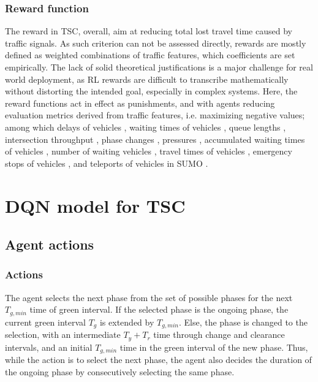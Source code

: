 \documentclass[journal]{IEEEtran}
\begin{document}
\subsubsection{Reward function}
The reward in TSC, overall, aim at reducing total lost travel time caused by traffic signals. As such criterion can not be assessed directly, rewards are mostly defined as weighted combinations of traffic features, which coefficients are set empirically. The lack of solid theoretical justifications is a major challenge for real world deployment, as RL rewards are difficult to transcribe mathematically without distorting the intended goal, especially in complex systems. Here, the reward functions act in effect as punishments, and with agents reducing evaluation metrics derived from traffic features, i.e. maximizing negative values; among which delays of vehicles \cite{genders2019opensource,wei2018intellilight,pol2016coordinated,zhang2020using,zhang2019partially,genders2018evaluating,touhbi2017adaptative}, waiting times of vehicles \cite{gao2017adaptative,liang2019deep,wei2018intellilight,alemzadeh2020adaptative,pol2016coordinated}, queue lengths \cite{li2016traffic,wei2018intellilight,wei2019colight,touhbi2017adaptative}, intersection throughput \cite{stevens2016reinforcement,wei2018intellilight,alemzadeh2020adaptative,touhbi2017adaptative}, phase changes \cite{wei2018intellilight,alemzadeh2020adaptative,pol2016coordinated}, pressures \cite{wei2019presslight,chen2020toward}, accumulated waiting times of vehicles \cite{vidali2019deep}, number of waiting vehicles \cite{alemzadeh2020adaptative}, travel times of vehicles \cite{wei2018intellilight}, emergency stops  of vehicles \cite{pol2016coordinated}, and teleports of vehicles in SUMO \cite{pol2016coordinated}.

\section{DQN model for TSC}
\label{sec:model}

\subsection{Agent actions}

\subsubsection{Actions}
The agent selects the next phase from the set of possible phases for the next $T_{g,min}$ time of green interval. If the selected phase is the ongoing phase, the current green interval $T_g$ is extended by $T_{g,min}$. Else, the phase is changed to the selection, with an intermediate $T_y+T_r$ time through change and clearance intervals, and an initial $T_{g,min}$ time in the green interval of the new phase. Thus, while the action is to select the next phase, the agent also decides the duration of the ongoing phase by consecutively selecting the same phase.
\\
\end{document}

